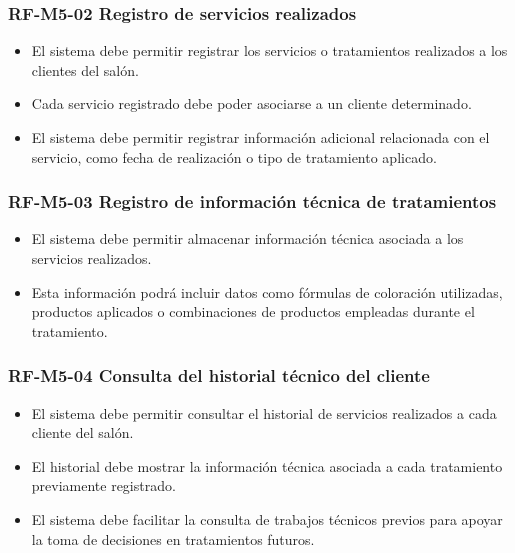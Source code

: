 \vspace{-0.75em}
\subsubsection{RF-M5-02 Registro de servicios realizados}
\vspace{-1em}

\begin{itemize}
    \item El sistema debe permitir registrar los servicios o tratamientos realizados a los clientes del salón.
    \item Cada servicio registrado debe poder asociarse a un cliente determinado.
    \item El sistema debe permitir registrar información adicional relacionada con el servicio, como fecha de realización o tipo de tratamiento aplicado.
\end{itemize}

\vspace{-0.75em}
\subsubsection{RF-M5-03 Registro de información técnica de tratamientos}
\vspace{-1em}

\begin{itemize}
    \item El sistema debe permitir almacenar información técnica asociada a los servicios realizados.
    \item Esta información podrá incluir datos como fórmulas de coloración utilizadas, productos aplicados o combinaciones de productos empleadas durante el tratamiento.
\end{itemize}

\vspace{-0.75em}
\subsubsection{RF-M5-04 Consulta del historial técnico del cliente}
\vspace{-1em}

\begin{itemize}
    \item El sistema debe permitir consultar el historial de servicios realizados a cada cliente del salón.
    \item El historial debe mostrar la información técnica asociada a cada tratamiento previamente registrado.
    \item El sistema debe facilitar la consulta de trabajos técnicos previos para apoyar la toma de decisiones en tratamientos futuros.
\end{itemize}

